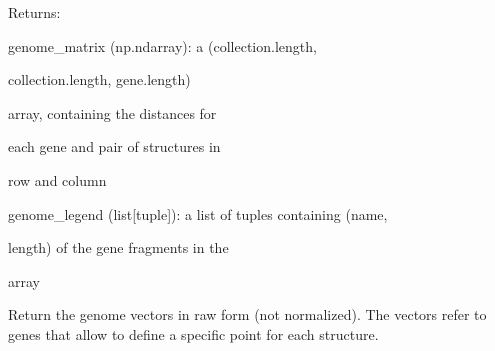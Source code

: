 \documentclass[letterpaper,10pt,english]{sphinxmanual}
\begin{document}
\begin{fulllineitems}
\begin{fulllineitems}
\begin{DUlineblock}{0em}
\item[] Returns:
\item[]
\begin{DUlineblock}{\DUlineblockindent}
\item[] genome\_matrix (np.ndarray): a (collection.length,
\item[]
\begin{DUlineblock}{\DUlineblockindent}
\item[] collection.length, gene.length)
\item[] array, containing the distances for
\item[] each gene and pair of structures in
\item[] row and column
\end{DUlineblock}
\item[] genome\_legend (list{[}tuple{]}): a list of tuples containing (name,
\item[]
\begin{DUlineblock}{\DUlineblockindent}
\item[] length) of the gene fragments in the
\item[] array
\end{DUlineblock}
\end{DUlineblock}
\end{DUlineblock}

\end{fulllineitems}


\begin{fulllineitems}
\label{doctree/soprano.analyse.phylogen.phylogenclust:soprano.analyse.phylogen.phylogenclust.PhylogenCluster.get_genome_vectors}
Return the genome vectors in raw form (not normalized).
The vectors refer to genes that allow to define a specific point for
each structure.


\end{fulllineitems}
\end{fulllineitems}
\end{document}
